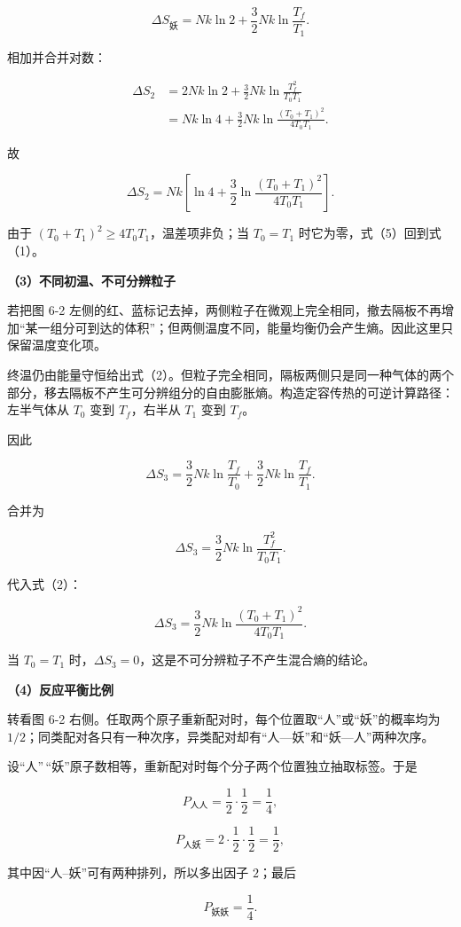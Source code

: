 \documentclass[12pt,a4paper,UTF8]{ctexart}
\begin{document}
\[\Delta S_{\text{妖}}
=Nk\ln2+\frac32Nk\ln\frac{T_f}{T_1}.\]

相加并合并对数：

\[\begin{aligned}
\Delta S_2
&=2Nk\ln2+\frac32Nk
\ln\frac{T_f^2}{T_0T_1}\\
&=Nk\ln4+\frac32Nk
\ln\frac{(T_0+T_1)^2}{4T_0T_1}.
\end{aligned}\]

故

\[\boxed{\Delta S_2
=Nk\left[\ln4+\frac32\ln\frac{(T_0+T_1)^2}{4T_0T_1}\right]}.\]

由于 \((T_0+T_1)^2\geq4T_0T_1\)，温差项非负；当 \(T_0=T_1\)
时它为零，式（5）回到式（1）。

\textbf{（3）不同初温、不可分辨粒子}

若把图 6-2
左侧的红、蓝标记去掉，两侧粒子在微观上完全相同，撤去隔板不再增加``某一组分可到达的体积''；但两侧温度不同，能量均衡仍会产生熵。因此这里只保留温度变化项。

终温仍由能量守恒给出式（2）。但粒子完全相同，隔板两侧只是同一种气体的两个部分，移去隔板不产生可分辨组分的自由膨胀熵。构造定容传热的可逆计算路径：左半气体从
\(T_0\) 变到 \(T_f\)，右半从 \(T_1\) 变到 \(T_f\)。

因此

\[\Delta S_3
=\frac32Nk\ln\frac{T_f}{T_0}
+\frac32Nk\ln\frac{T_f}{T_1}.\]

合并为

\[\Delta S_3
=\frac32Nk\ln\frac{T_f^2}{T_0T_1}.\]

代入式（2）：

\[\boxed{\Delta S_3
=\frac32Nk\ln\frac{(T_0+T_1)^2}{4T_0T_1}}.\]

当 \(T_0=T_1\)
时，\(\Delta S_3=0\)，这是不可分辨粒子不产生混合熵的结论。

\textbf{（4）反应平衡比例}

转看图 6-2
右侧。任取两个原子重新配对时，每个位置取``人''或``妖''的概率均为
\(1/2\)；同类配对各只有一种次序，异类配对却有``人---妖''和``妖---人''两种次序。

设``人''\,``妖''原子数相等，重新配对时每个分子两个位置独立抽取标签。于是

\[P_{\text{人人}}=\frac12\cdot\frac12=\frac14,\]

\[P_{\text{人妖}}=2\cdot\frac12\cdot\frac12=\frac12,\]

其中因``人--妖''可有两种排列，所以多出因子 \(2\)；最后

\[P_{\text{妖妖}}=\frac14.\]
\end{document}
